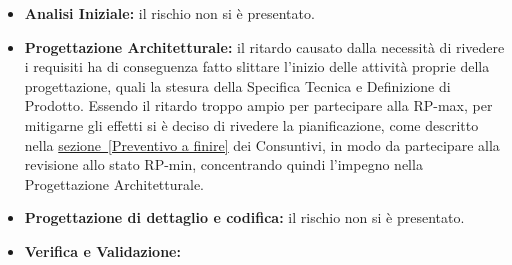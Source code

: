 \documentclass[a4paper,11pt]{article}
\begin{document}
\begin{itemize}
			\begin{itemize}
				\item\textbf{Analisi Iniziale:} il rischio non si è presentato.
				\item\textbf{Progettazione Architetturale:} il ritardo causato dalla necessità di rivedere i requisiti ha di conseguenza fatto slittare l'inizio delle attività proprie della progettazione, quali la stesura della Specifica Tecnica e Definizione di Prodotto. Essendo il ritardo troppo ampio per partecipare alla RP-max, per mitigarne gli effetti si è deciso di rivedere la pianificazione, come descritto nella \underline{sezione~\ref{Preventivo a finire}} dei Consuntivi, in modo da partecipare alla revisione allo stato RP-min, concentrando quindi l'impegno nella Progettazione Architetturale.
				\item\textbf{Progettazione di dettaglio e codifica:} il rischio non si è presentato.
				\item\textbf{Verifica e Validazione:}
			\end{itemize}
		\end{itemize}
\end{document}
